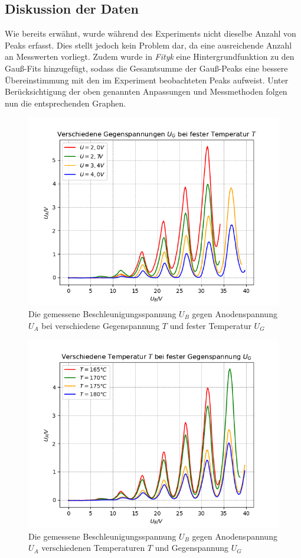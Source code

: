 \documentclass{article}
\begin{document}
\begin{multicols}{2}
\subsection*{Diskussion der Daten}
 Wie bereits erwähnt, wurde während des Experiments nicht dieselbe Anzahl von Peaks erfasst. Dies stellt jedoch 
 kein Problem dar, da eine ausreichende Anzahl an Messwerten vorliegt. Zudem wurde in \textit{Fityk} eine 
 Hintergrundfunktion zu den Gauß-Fits hinzugefügt, sodass die Gesamtsumme der Gauß-Peaks eine bessere 
 Übereinstimmung mit den im Experiment beobachteten Peaks aufweist. Unter Berücksichtigung der oben genannten Anpassungen 
 und Messmethoden folgen nun die entsprechenden Graphen. 
\begin{figure}[H]
  \centering
  \includegraphics[scale=0.55]{FH_vieleT.png}
  \caption{Die gemessene Beschleunigungsspannung $U_B$ gegen Anodenspannung $U_A$ bei
   verschiedene Gegenspannung $T$ und fester Temperatur $U_G$}
\end{figure}
\clearpage

\begin{figure}[H]
  \centering
  \includegraphics[scale=0.55]{FH_vieleU.png}
  \caption{Die gemessene Beschleunigungsspannung $U_B$ gegen Anodenspannung $U_A$ 
  verschiedenen Temperaturen $T$ und Gegenspannung $U_G$}
\end{figure}


\end{multicols}
\end{document}
